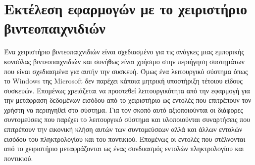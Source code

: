 \section{Εκτέλεση εφαρμογών με το χειριστήριο βιντεοπαιχνιδιών}

Ένα χειριστήριο βιντεοπαιχνιδιών είναι σχεδιασμένο για τις ανάγκες μιας εμπορικής κονσόλας
βιντεοπαιχνιδιών και συνήθως είναι χρήσιμο στην περιήγηση συστημάτων που είναι σχεδιασμένα
για αυτήν την συσκευή. Όμως ένα λειτουργικό σύστημα όπως το Windows της Microsoft δεν
παρέχει κάποια μητρική υποστήριξη τέτοιου είδους συσκευών. Επομένως χρειάζεται να προστεθεί
λειτουργικότητα από την εφαρμογή για την μετάφραση δεδομένων εισόδου από το χειριστήριο ως
εντολές που επιτρέπουν τον χρήστη να περιηγηθεί στο σύστημα. Για τον σκοπό αυτό αξιοποιούνται
οι διάφορες συντομεύσεις που παρέχει το λειτουργικό σύστημα και υλοποιούνται συναρτήσεις που
επιτρέπουν την εικονική κλήση αυτών των συντομεύσεων αλλά και άλλων εντολών εισόδου του
πληκτρολογίου και του ποντικιού. Επομένως οι εντολές που στέλνονται από το χειριστήριο μεταφράζονται
ως ένας συνδυασμός εντολών πληκτρολογίου και ποντικιού. 